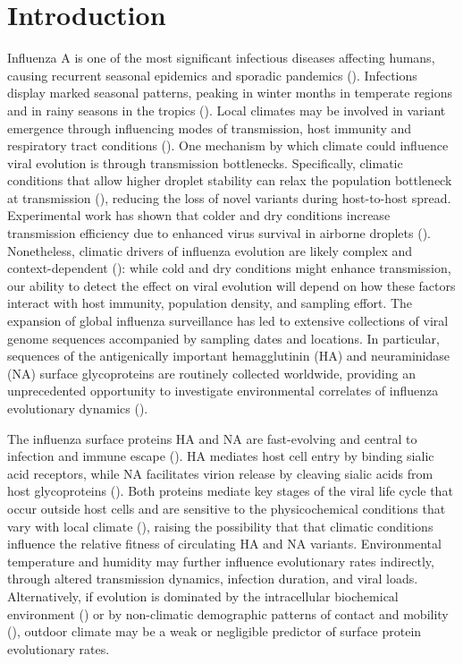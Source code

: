 \documentclass[11pt, a4paper]{article}
\begin{document}
\section*{Introduction}

Influenza A is one of the most significant infectious diseases affecting humans, causing recurrent seasonal epidemics and sporadic pandemics (\cite{hsieh_influenza_2006, trovao_when_2020}). Infections display marked seasonal patterns, peaking in winter months in temperate regions and in rainy seasons in the tropics (\cite{petrova_evolution_2018}). Local climates may be involved in variant emergence through influencing modes of transmission, host immunity and respiratory tract conditions (\cite{kudo_low_2019}). One mechanism by which climate could influence viral evolution is through transmission bottlenecks. Specifically, climatic conditions that allow higher droplet stability can relax the population bottleneck at transmission (\cite{frise_contact_2016}), reducing the loss of novel variants during host-to-host spread. Experimental work has shown that colder and dry conditions increase transmission efficiency due to enhanced virus survival in airborne droplets (\cite{lowen_influenza_2007, shaman_absolute_2009}). Nonetheless, climatic drivers of influenza evolution are likely complex and context-dependent (\cite{deyle_global_2016}): while cold and dry conditions might enhance transmission, our ability to detect the effect on viral evolution will depend on how these factors interact with host immunity, population density, and sampling effort. The expansion of global influenza surveillance has led to extensive collections of viral genome sequences accompanied by sampling dates and locations. In particular, sequences of the antigenically important hemagglutinin (HA) and neuraminidase (NA) surface glycoproteins are routinely collected worldwide, providing an unprecedented opportunity to investigate environmental correlates of influenza evolutionary dynamics (\cite{volz_viral_2013}). 

The influenza surface proteins HA and NA are fast-evolving and central to infection and immune escape (\cite{nelson_evolution_2007}). HA mediates host cell entry by binding sialic acid receptors, while NA facilitates virion release by cleaving sialic acids from host glycoproteins (\cite{matsuoka_comprehensive_2013}). Both proteins mediate key stages of the viral life cycle that occur outside host cells and are sensitive to the physicochemical conditions that vary with local climate (\cite{klenow_influenza_2023, tosheva_hemagglutinin_2023}), raising the possibility that that climatic conditions influence the relative fitness of circulating HA and NA variants. Environmental temperature and humidity may further influence evolutionary rates indirectly, through altered transmission dynamics, infection duration, and viral loads. Alternatively, if evolution is dominated by the intracellular biochemical environment (\cite{partlow_influenza_2025}) or by non-climatic demographic patterns of contact and mobility (\cite{cauchemez_role_2011, endo_within_2021}), outdoor climate may be a weak or negligible predictor of surface protein evolutionary rates.
\end{document}
